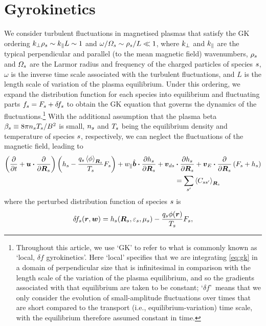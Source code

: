 \documentclass{jpp}
\begin{document}
\section{Gyrokinetics}
\label{sec:gk}

We consider turbulent fluctuations in magnetised plasmas that satisfy the GK ordering \mbox{\(k_\perp \rho_s \sim k_\parallel L \sim 1\)} and \mbox{\(\omega / \varOmega_s \sim \rho_s / L \ll 1\)}, where \(k_\perp\) and \(k_\parallel\) are the typical perpendicular and parallel (to the mean magnetic field) wavenumbers, \(\rho_s\) and \(\varOmega_s\) are the Larmor radius and frequency of the charged particles of species \(s\), \(\omega\) is the inverse time scale associated with the turbulent fluctuations, and \(L\) is the length scale of variation of the plasma equilibrium. Under this ordering, we expand the distribution function for each species into equilibrium and fluctuating parts \(f_{s} = F_{s} + \delta \! f_{s}\) to obtain the GK equation that governs the dynamics of the fluctuations.\footnote{Throughout this article, we use `GK' to refer to what is commonly known as `local, \(\delta\!f\) gyrokinetics'. Here `local' specifies that we are integrating \cref{eq:gk} in a domain of perpendicular size that is infinitesimal in comparison with the length scale of the variation of the plasma equilibrium, and so the gradients associated with that equilibrium are taken to be constant; `\(\delta\!f\)'~means that we only consider the evolution of small-amplitude fluctuations over times that are short compared to the transport (i.e., equilibrium-variation) time scale, with the equilibrium therefore assumed constant in time.} With the additional assumption that the plasma beta \(\beta_s \equiv 8\pi n_{s} T_{s} / B^2\) is small, \(n_{s}\) and \(T_{s}\) being the equilibrium density and temperature of species \(s\), respectively, we can neglect the fluctuations of the magnetic field, leading to
\begin{align}
	\left(\frac{\partial}{\partial t} +  \boldsymbol{u}\boldsymbol{\cdot}\frac{\partial}{\partial \boldsymbol{R}_s}\right) \left(h_s - \frac{q_s \left\langle \phi \right\rangle_{\boldsymbol{R}_s}}{T_{s}} F_{s}\right) +  w_\parallel \hat{\boldsymbol{b}} \boldsymbol{\cdot} \frac{\partial h_s}{\partial \boldsymbol{R}_s} + \boldsymbol{v}_{ds}& \boldsymbol{\cdot} \frac{\partial h_s}{\partial \boldsymbol{R}_s} + \boldsymbol{v}_E \boldsymbol{\cdot} \frac{\partial}{\partial \boldsymbol{R}_s} \left(F_{s} + h_s\right) \nonumber \\
	&  = \sum_{s'}\left\langle C_{s s'} \right\rangle_{\boldsymbol{R}_s}
	\label{eq:gk}
\end{align}
where the perturbed distribution function of species \(s\) is 
\begin{equation}
	\delta \! f_{s}(\boldsymbol{r}, \boldsymbol{w}) = h_s(\boldsymbol{R}_s, \varepsilon_s, \mu_s) - \frac{q_s  \phi(\boldsymbol{r})}{T_{s}}F_{s}, 
	\label{eq:delta_f}
\end{equation}
\end{document}
